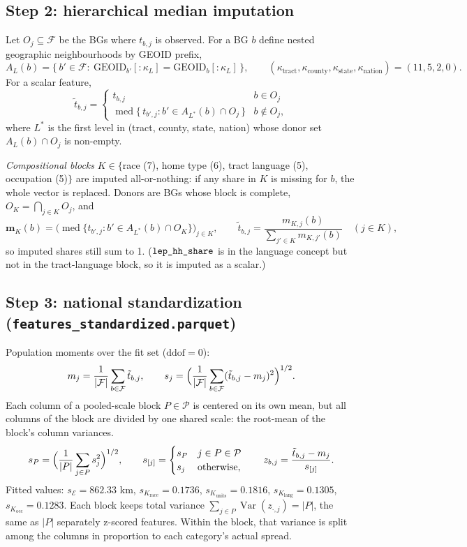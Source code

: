 \documentclass[11pt]{article}
\newcommand{\med}{\operatorname{med}}
\newcommand{\Var}{\operatorname{Var}}
\newcommand{\ft}[1]{\texttt{\detokenize{#1}}}
\begin{document}
\subsection{Step 2: hierarchical median imputation}

Let $O_j\subseteq\mathcal F$ be the BGs where $t_{b,j}$ is observed. For a BG $b$ define nested
geographic neighbourhoods by GEOID prefix,
\[
A_L(b)=\{\,b'\in\mathcal F:\ \mathrm{GEOID}_{b'}[{:}\kappa_L]=\mathrm{GEOID}_b[{:}\kappa_L]\,\},
\qquad (\kappa_{\text{tract}},\kappa_{\text{county}},\kappa_{\text{state}},\kappa_{\text{nation}})=(11,5,2,0).
\]
For a scalar feature,
\[
\tilde t_{b,j}=\begin{cases}
t_{b,j} & b\in O_j\\
\med\{\,t_{b',j}: b'\in A_{L^*}(b)\cap O_j\,\} & b\notin O_j,
\end{cases}
\]
where $L^*$ is the first level in (tract, county, state, nation) whose donor set
$A_L(b)\cap O_j$ is non-empty.

\emph{Compositional blocks} $K\in\{$race (7), home type (6), tract language (5), occupation
(5)$\}$ are imputed all-or-nothing: if any share in $K$ is missing for $b$, the whole vector is
replaced. Donors are BGs whose block is complete, $O_K=\bigcap_{j\in K}O_j$, and
\[
\mathbf m_K(b)=\bigl(\med\{t_{b',j}:b'\in A_{L^*}(b)\cap O_K\}\bigr)_{j\in K},\qquad
\tilde t_{b,j}=\frac{m_{K,j}(b)}{\sum_{j'\in K}m_{K,j'}(b)}\quad(j\in K),
\]
so imputed shares still sum to 1. ($\ft{lep_hh_share}$ is in the language concept but not in
the tract-language block, so it is imputed as a scalar.)

\subsection{Step 3: national standardization (\texorpdfstring{\texttt{features\_standardized.parquet}}{features\_standardized.parquet})}

Population moments over the fit set ($\mathrm{ddof}=0$):
\[
m_j=\frac{1}{|\mathcal F|}\sum_{b\in\mathcal F}\tilde t_{b,j},\qquad
s_j=\Bigl(\frac{1}{|\mathcal F|}\sum_{b\in\mathcal F}(\tilde t_{b,j}-m_j)^2\Bigr)^{1/2}.
\]
Each column of a pooled-scale block $P\in\mathcal P$ is centered on its own mean, but all
columns of the block are divided by one shared scale: the root-mean of the block's column
variances.
\[
s_P=\Bigl(\frac{1}{|P|}\sum_{j\in P}s_j^2\Bigr)^{1/2},\qquad
s_{[j]}=\begin{cases}s_P & j\in P\in\mathcal P\\ s_j & \text{otherwise,}\end{cases}\qquad
z_{b,j}=\frac{\tilde t_{b,j}-m_j}{s_{[j]}} .
\]
Fitted values: $s_{\mathcal E}=862.33$ km, $s_{K_{\text{race}}}=0.1736$,
$s_{K_{\text{units}}}=0.1816$, $s_{K_{\text{lang}}}=0.1305$, $s_{K_{\text{occ}}}=0.1283$.
Each block keeps total variance $\sum_{j\in P}\Var(z_{\cdot,j})=|P|$, the same as $|P|$
separately z-scored features. Within the block, that variance is split among the columns in
proportion to each category's actual spread.
\end{document}
